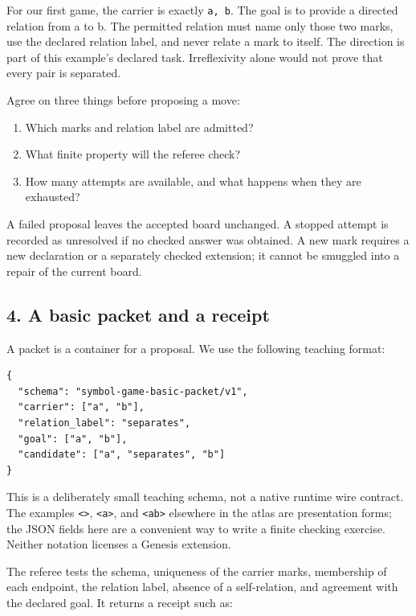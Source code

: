\documentclass[
  11pt,
]{article}
\newcommand{\passthrough}[1]{#1}
\providecommand{\tightlist}{%
  \setlength{\itemsep}{0pt}\setlength{\parskip}{0pt}}
\begin{document}
For our first game, the carrier is exactly
\passthrough{\lstinline!a, b!}. The goal is to provide a directed
relation from a to b. The permitted relation must name only those two
marks, use the declared relation label, and never relate a mark to
itself. The direction is part of this example's declared task.
Irreflexivity alone would not prove that every pair is separated.

Agree on three things before proposing a move:

\begin{enumerate}
\def\labelenumi{\arabic{enumi}.}
\tightlist
\item
  Which marks and relation label are admitted?
\item
  What finite property will the referee check?
\item
  How many attempts are available, and what happens when they are
  exhausted?
\end{enumerate}

A failed proposal leaves the accepted board unchanged. A stopped attempt
is recorded as unresolved if no checked answer was obtained. A new mark
requires a new declaration or a separately checked extension; it cannot
be smuggled into a repair of the current board.

\subsection{4. A basic packet and a
receipt}\label{a-basic-packet-and-a-receipt}

A packet is a container for a proposal. We use the following teaching
format:

\begin{lstlisting}
{
  "schema": "symbol-game-basic-packet/v1",
  "carrier": ["a", "b"],
  "relation_label": "separates",
  "goal": ["a", "b"],
  "candidate": ["a", "separates", "b"]
}
\end{lstlisting}

This is a deliberately small teaching schema, not a native runtime wire
contract. The examples \passthrough{\lstinline!<>!},
\passthrough{\lstinline!<a>!}, and \passthrough{\lstinline!<ab>!}
elsewhere in the atlas are presentation forms; the JSON fields here are
a convenient way to write a finite checking exercise. Neither notation
licenses a Genesis extension.

The referee tests the schema, uniqueness of the carrier marks,
membership of each endpoint, the relation label, absence of a
self-relation, and agreement with the declared goal. It returns a
receipt such as:
\end{document}
